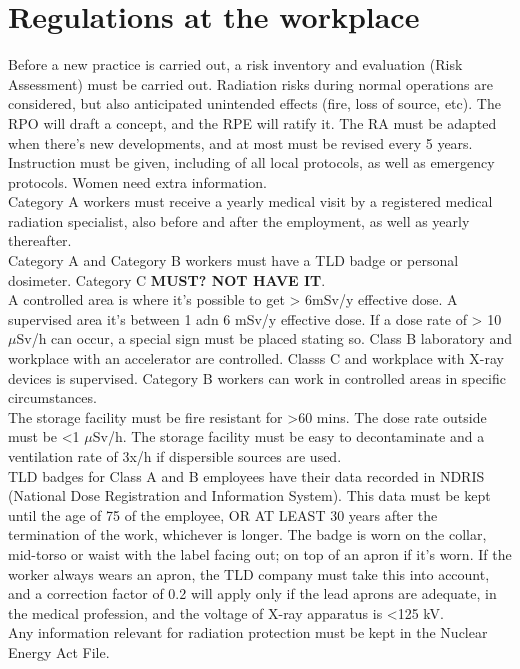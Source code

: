 \section{Regulations at the workplace}
Before a new practice is carried out, a risk inventory and evaluation (Risk Assessment) must be carried out. Radiation risks during normal operations are considered, but also anticipated unintended effects (fire, loss of source, etc). The RPO will draft a concept, and the RPE will ratify it. The RA must be adapted when there's new developments, and at most must be revised every 5 years. Instruction must be given, including of all local protocols, as well as emergency protocols. Women need extra information. \\
Category A workers must receive a yearly medical visit by a registered medical radiation specialist, also before and after the employment, as well as yearly thereafter. \\
Category A and Category B workers must have a TLD badge or personal dosimeter. Category C \textbf{MUST? NOT HAVE IT}. \\
A controlled area is where it's possible to get > 6mSv/y effective dose. A supervised area it's between 1 adn 6 mSv/y effective dose. If a dose rate of > 10 $\mu$Sv/h can occur, a special sign must be placed stating so. Class B laboratory and workplace with an accelerator are controlled. Classs C and workplace with X-ray devices is supervised. Category B workers can work in controlled areas in specific circumstances. \\
The storage facility must be fire resistant for >60 mins. The dose rate outside must be <1 $\mu$Sv/h. The storage facility must be easy to decontaminate and a ventilation rate of 3x/h if dispersible sources are used.\\
TLD badges for Class A and B employees have their data recorded in NDRIS (National Dose Registration and Information System). This data must be kept until the age of 75 of the employee, OR AT LEAST 30 years after the termination of the work, whichever is longer. The badge is worn on the collar, mid-torso or waist with the label facing out; on top of an apron if it's worn. If the worker always wears an apron, the TLD company must take this into account, and a correction factor of 0.2 will apply only if the lead aprons are adequate, in the medical profession, and the voltage of X-ray apparatus is <125 kV. \\
Any information relevant for radiation protection must be kept in the Nuclear Energy Act File.
